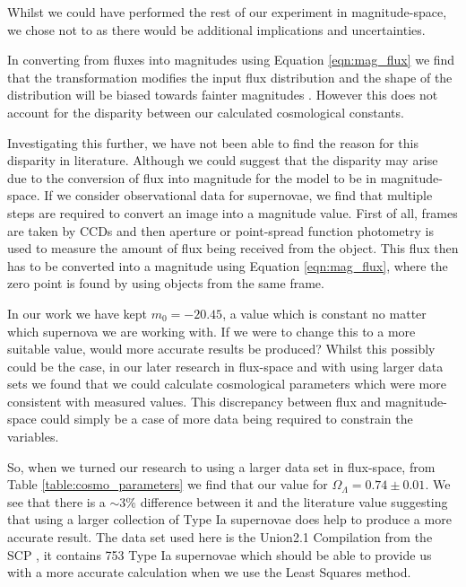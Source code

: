 \documentclass[twocolumn]{revtex4}
\begin{document}
Whilst we could have performed the rest of our experiment in magnitude-space, we chose not to as there would be additional implications and uncertainties.

In converting from fluxes into magnitudes using Equation \ref{eqn:mag_flux} we find that the transformation modifies the input flux distribution and the shape of the distribution will be biased towards fainter magnitudes \cite{magspace_stats}. However this does not account for the disparity between our calculated cosmological constants. 

Investigating this further, we have not been able to find the reason for this disparity in literature. Although we could suggest that the disparity may arise due to the conversion of flux into magnitude for the model to be in magnitude-space. If we consider observational data for supernovae, we find that multiple steps are required to convert an image into a magnitude value. First of all, frames are taken by CCDs and then aperture or point-spread function photometry is used to measure the amount of flux being received from the object. This flux then has to be converted into a magnitude using Equation \ref{eqn:mag_flux}, where the zero point is found by using objects from the same frame. 

In our work we have kept $m_0=-20.45$, a value which is constant no matter which supernova we are working with. If we were to change this to a more suitable value, would more accurate results be produced? Whilst this possibly could be the case, in our later research in flux-space and with using larger data sets we found that we could calculate cosmological parameters which were more consistent with measured values. This discrepancy between flux and magnitude-space could simply be a case of more data being required to constrain the variables. 

So, when we turned our research to using a larger data set in flux-space, from Table \ref{table:cosmo_parameters} we find that our value for $\Omega_\Lambda=0.74\pm0.01$. We see that there is a $\sim 3\%$ difference between it and the literature value suggesting that using a larger collection of Type Ia supernovae does help to produce a more accurate result. The data set used here is the Union2.1 Compilation from the SCP \cite{dataset_2}, it contains 753 Type Ia supernovae which should be able to provide us with a more accurate calculation when we use the Least Squares method. 
\end{document}
